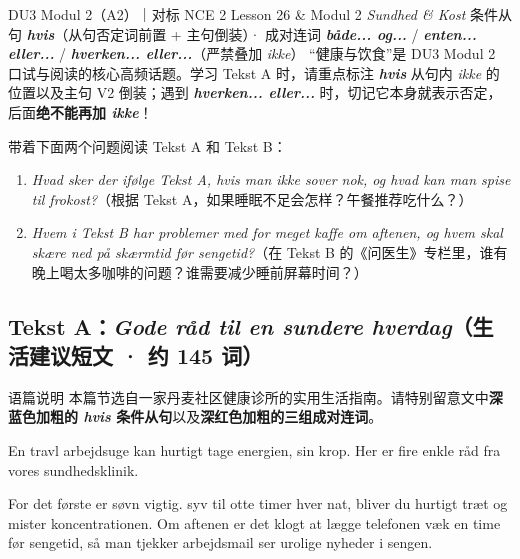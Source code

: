 {DU3 Modul 2（A2）｜对标 NCE 2 Lesson 26 \& Modul 2 \textit{Sundhed \& Kost}}
{条件从句 \textbf{\textit{hvis}}（从句否定词前置 + 主句倒装）· 成对连词 \textbf{\textit{både... og...}} / \textbf{\textit{enten... eller...}} / \textbf{\textit{hverken... eller...}}（严禁叠加 \textit{ikke}）}
{“健康与饮食”是 DU3 Modul 2 口试与阅读的核心高频话题。学习 Tekst A 时，请重点标注 \textbf{\textit{hvis}} 从句内 \textit{ikke} 的位置以及主句 V2 倒装；遇到 \textbf{\textit{hverken... eller...}} 时，切记它本身就表示否定，后面\textbf{绝不能再加 \textit{ikke}}！}

\begin{foerduleaeser}
带着下面两个问题阅读 Tekst A 和 Tekst B：
\begin{enumerate}
  \item \textit{Hvad sker der ifølge Tekst A, hvis man ikke sover nok, og hvad kan man spise til frokost?}（根据 Tekst A，如果睡眠不足会怎样？午餐推荐吃什么？）
  \item \textit{Hvem i Tekst B har problemer med for meget kaffe om aftenen, og hvem skal skære ned på skærmtid før sengetid?}（在 Tekst B 的《问医生》专栏里，谁有晚上喝太多咖啡的问题？谁需要减少睡前屏幕时间？）
\end{enumerate}
\end{foerduleaeser}


\subsection*{Tekst A：\textit{Gode råd til en sundere hverdag}（生活建议短文 · 约 145 词）}

\begin{tipbox}{语篇说明}
本篇节选自一家丹麦社区健康诊所的实用生活指南。请特别留意文中\textbf{\color{NCDNavy}深蓝色加粗的 \textit{hvis} 条件从句}以及\textbf{\color{NCDRed}深红色加粗的三组成对连词}。
\end{tipbox}

En travl arbejdsuge kan hurtigt tage energien,  sin krop. Her er fire enkle råd fra vores sundhedsklinik.

For det første er søvn vigtig.  syv til otte timer hver nat, bliver du hurtigt træt og mister koncentrationen. Om aftenen er det klogt at lægge telefonen væk en time før sengetid, så man  tjekker arbejdsmail  ser urolige nyheder i sengen.

